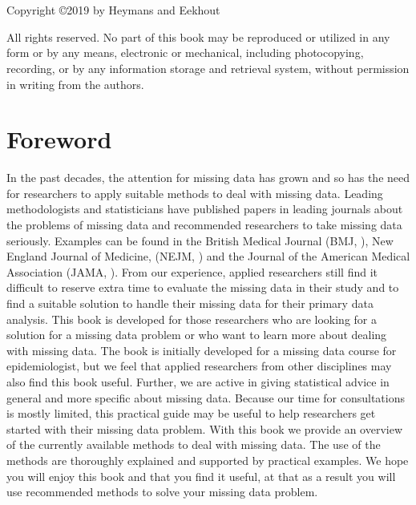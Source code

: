 \documentclass[]{book}
\title{}
\author{}
\date{2019-01-23}
\begin{document}
{
\setcounter{tocdepth}{1}
\tableofcontents
}
\chapter*{}\label{section}

Copyright ©2019 by Heymans and Eekhout

All rights reserved. No part of this book may be reproduced or utilized
in any form or by any means, electronic or mechanical, including
photocopying, recording, or by any information storage and retrieval
system, without permission in writing from the authors.

\chapter*{Foreword}\label{foreword}

In the past decades, the attention for missing data has grown and so has
the need for researchers to apply suitable methods to deal with missing
data. Leading methodologists and statisticians have published papers in
leading journals about the problems of missing data and recommended
researchers to take missing data seriously. Examples can be found in the
British Medical Journal (BMJ, \citet{sterne2009multiple}), New England
Journal of Medicine, (NEJM, \citet{little2012prevention}) and the
Journal of the American Medical Association (JAMA, \citet{Li2015}). From
our experience, applied researchers still find it difficult to reserve
extra time to evaluate the missing data in their study and to find a
suitable solution to handle their missing data for their primary data
analysis. This book is developed for those researchers who are looking
for a solution for a missing data problem or who want to learn more
about dealing with missing data. The book is initially developed for a
missing data course for epidemiologist, but we feel that applied
researchers from other disciplines may also find this book useful.
Further, we are active in giving statistical advice in general and more
specific about missing data. Because our time for consultations is
mostly limited, this practical guide may be useful to help researchers
get started with their missing data problem. With this book we provide
an overview of the currently available methods to deal with missing
data. The use of the methods are thoroughly explained and supported by
practical examples. We hope you will enjoy this book and that you find
it useful, at that as a result you will use recommended methods to solve
your missing data problem.
\end{document}
